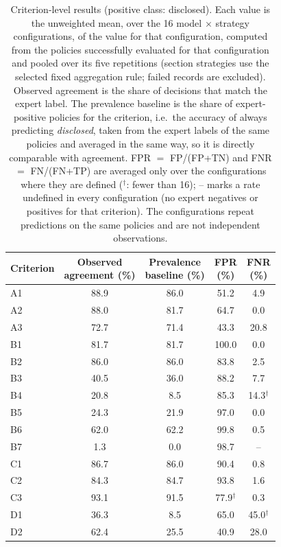 \begin{table}[t]
\centering\small
\setlength{\tabcolsep}{6pt}
\caption{Criterion-level results (positive class: disclosed). Each value is the unweighted mean, over the 16 model $\times$ strategy configurations, of the value for that configuration, computed from the policies successfully evaluated for that configuration and pooled over its five repetitions (section strategies use the selected fixed aggregation rule; failed records are excluded). Observed agreement is the share of decisions that match the expert label. The prevalence baseline is the share of expert-positive policies for the criterion, i.e.\ the accuracy of always predicting \textit{disclosed}, taken from the expert labels of the same policies and averaged in the same way, so it is directly comparable with agreement. FPR $=$ FP/(FP+TN) and FNR $=$ FN/(FN+TP) are averaged only over the configurations where they are defined ($^{\dagger}$: fewer than 16); -- marks a rate undefined in every configuration (no expert negatives or positives for that criterion). The configurations repeat predictions on the same policies and are not independent observations.}
\label{tab:llm_criterion}
\begin{tabular}{lcccc}
\toprule
Criterion & \shortstack{Observed\\agreement (\%)} & \shortstack{Prevalence\\baseline (\%)} & \shortstack{FPR\\(\%)} & \shortstack{FNR\\(\%)} \\
\midrule
A1 & 88.9 & 86.0 & 51.2 & 4.9 \\
A2 & 88.0 & 81.7 & 64.7 & 0.0 \\
A3 & 72.7 & 71.4 & 43.3 & 20.8 \\
B1 & 81.7 & 81.7 & 100.0 & 0.0 \\
B2 & 86.0 & 86.0 & 83.8 & 2.5 \\
B3 & 40.5 & 36.0 & 88.2 & 7.7 \\
B4 & 20.8 & 8.5 & 85.3 & 14.3$^{\dagger}$ \\
B5 & 24.3 & 21.9 & 97.0 & 0.0 \\
B6 & 62.0 & 62.2 & 99.8 & 0.5 \\
B7 & 1.3 & 0.0 & 98.7 & -- \\
C1 & 86.7 & 86.0 & 90.4 & 0.8 \\
C2 & 84.3 & 84.7 & 93.8 & 1.6 \\
C3 & 93.1 & 91.5 & 77.9$^{\dagger}$ & 0.3 \\
D1 & 36.3 & 8.5 & 65.0 & 45.0$^{\dagger}$ \\
D2 & 62.4 & 25.5 & 40.9 & 28.0 \\
\bottomrule
\end{tabular}
\end{table}